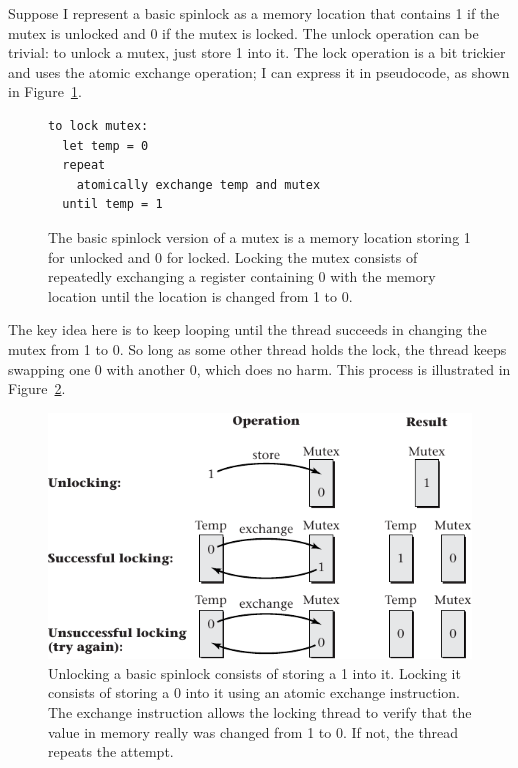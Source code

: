 Suppose I represent a basic spinlock as a memory location that contains 1 if
the mutex is unlocked and 0 if the mutex is locked.  The unlock
operation can be trivial: to unlock a mutex, just store 1 into it.
The lock operation is a bit trickier and uses the atomic exchange
operation; I can express it in pseudocode, as shown in
Figure~\ref{basic-spinlock-lock}.
\begin{figure}
\begin{verbatim}
to lock mutex:
  let temp = 0
  repeat
    atomically exchange temp and mutex
  until temp = 1
\end{verbatim}
\caption{The basic spinlock version of a mutex is a memory location
  storing 1 for unlocked and 0 for locked.  Locking the mutex consists of
  repeatedly exchanging a register containing 0 with the memory
  location until the location is changed from 1 to 0.}
\label{basic-spinlock-lock}
\end{figure}
The key idea here is to keep looping until the thread succeeds in changing the
mutex from 1 to 0.  So long as some other thread holds the
lock, the thread keeps swapping one 0 with another 0, which does no harm.
This process is illustrated in Figure~\ref{scan-4-4}.
\begin{figure}
\centerline{\includegraphics{hail_f0408}}
\caption{Unlocking a basic spinlock consists of storing a 1 into it.
  Locking it consists of storing a 0 into it using an atomic exchange
  instruction.  The exchange instruction allows the locking thread to verify that the
  value in memory really was changed from 1 to 0.  If not, the thread
  repeats the attempt.}
\label{scan-4-4}
\end{figure}

